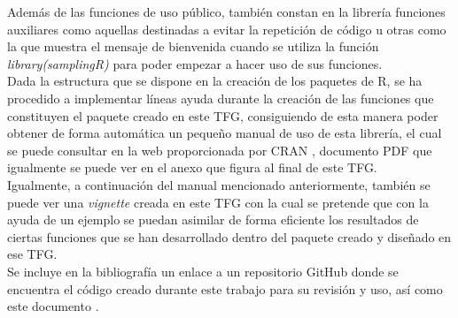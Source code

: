 Además de las funciones de uso público, también constan en la librería funciones auxiliares como aquellas destinadas a evitar la repetición de código u otras como la que muestra el mensaje de bienvenida cuando se utiliza la función \textit{library(samplingR)} para poder empezar a hacer uso de sus funciones.\\

Dada la estructura que se dispone en la creación de los paquetes de R, se ha procedido a implementar líneas ayuda durante la creación de las funciones que constituyen el paquete creado en este TFG, consiguiendo de esta manera poder obtener de forma automática un pequeño manual de uso de esta librería, el cual se puede consultar en la web proporcionada por CRAN \cite{samplingR}, documento PDF que igualmente se puede ver en el anexo que figura al final de este TFG. \\

Igualmente, a continuación del manual mencionado anteriormente, también se puede ver una \textit{vignette}  creada en este TFG con la cual se pretende que con la ayuda de un ejemplo se puedan asimilar de forma eficiente los resultados de ciertas funciones que se han desarrollado dentro del paquete creado y diseñado en ese TFG.\\

Se incluye en la bibliografía un enlace a un repositorio GitHub donde se encuentra el código creado durante este trabajo para su revisión y uso, así como este documento \cite{github}.

